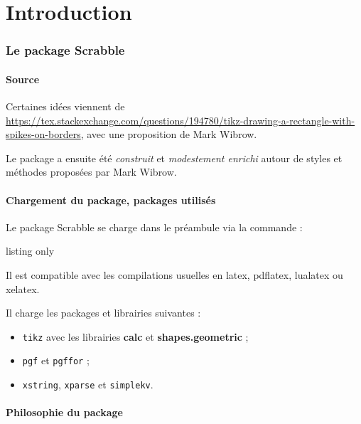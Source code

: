 \documentclass{article}
\newcommand\Cle[1]{{\bfseries\sffamily\textlangle #1\textrangle}}
\begin{document}
\part*{Introduction}

\section{Le package Scrabble}

\subsection{Source}

Certaines idées viennent de \url{https://tex.stackexchange.com/questions/194780/tikz-drawing-a-rectangle-with-spikes-on-borders}, avec une proposition de Mark Wibrow.

\smallskip

Le package a ensuite été \textit{construit} et \textit{modestement enrichi} autour de styles et méthodes proposées par Mark Wibrow.

\subsection{Chargement du package, packages utilisés}

Le package \textsf{Scrabble} se charge dans le préambule via la commande :

\begin{PresentationCode}{listing only}
\usepackage[fr]{Scrabble}
\end{PresentationCode}

Il est compatible avec les compilations usuelles en \textsf{latex}, \textsf{pdflatex}, \textsf{lualatex} ou \textsf{xelatex}.

\medskip

Il charge les packages et librairies suivantes :

\begin{itemize}
	\item \texttt{tikz} avec les librairies \Cle{calc} et \Cle{shapes.geometric} ;
	\item \texttt{pgf} et \texttt{pgffor} ;
	\item \texttt{xstring}, \texttt{xparse} et \texttt{simplekv}.
\end{itemize}

\subsection{\og Philosophie \fg{} du package}
\end{document}
